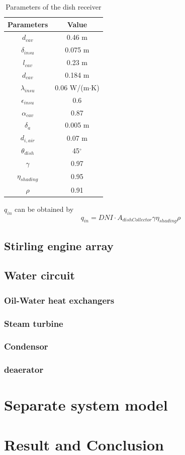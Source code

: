 \documentclass{article}
\begin{document}
\begin{table}[htbp]
	\caption{Parameters of the dish receiver}
	\begin{center}
	\begin{tabular}{cc}
		\toprule
		Parameters	&	Value\\
		\midrule
		$d_{cav}$	&	0.46 m\\
		$\delta_{insu}$	&	0.075 m\\
		$l_{cav}$	&	0.23 m\\
		$d_{cav}$	&	0.184 m\\
		$\lambda_{insu}$	&	0.06 W/(m$\cdot$K)\\
		$\epsilon_{insu}$	&	0.6\\
		$\alpha_{cav}$	&	0.87\\
		$\delta_a$	&	0.005 m\\
		$d_{i,air}$	&	0.07 m\\
		$\theta_{dish}$	&	45$^\circ$\\
		$\gamma$	&	0.97\\
		$\eta_{shading}$	&	0.95\\
		$\rho$	&	0.91\\
		\bottomrule
	\end{tabular}
	\end{center}
	\label{tab:dishReceiver}
\end{table}
$q_{in}$ can be obtained by
\begin{equation}
q_{in}=DNI\cdot A_{dishCollector}\gamma\eta_{shading}\rho\label{eq:q_in}
\end{equation}

\subsection{Stirling engine array}

\subsection{Water circuit}

\subsubsection{Oil-Water heat exchangers}

\subsubsection{Steam turbine}

\subsubsection{Condensor}

\subsubsection{deaerator}

\section{Separate system model}

\section{Result and Conclusion}

\clearpage


\end{document}
